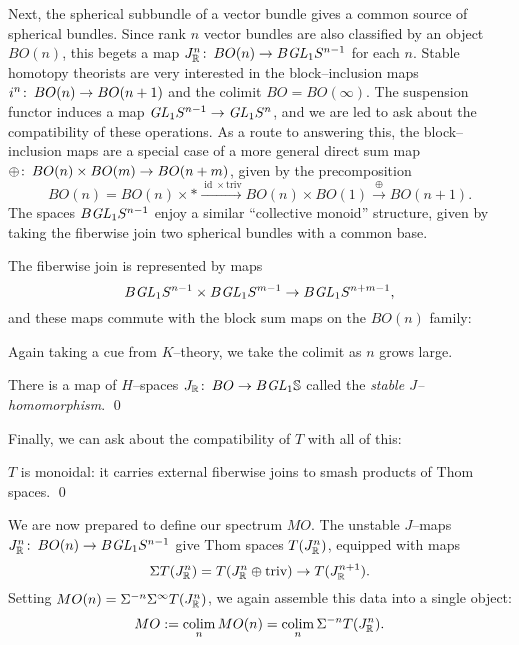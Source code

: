 Next, the spherical subbundle of a vector bundle gives a common source of spherical bundles.  Since rank $n$ vector bundles are also classified by an object $BO(n)$, this begets a map $J_{\mathbb R}^n\colon\thinspace BO(n) \to B \mathit{GL}_1 S^{n-1}$ for each $n$.  Stable homotopy theorists are very interested in the block--inclusion maps $i^n\colon\thinspace BO(n) \to BO(n+1)$ and the colimit $BO = BO(\infty)$.  The suspension functor induces a map $\mathit{GL}_1 S^{n-1} \to \mathit{GL}_1 S^n$, and we are led to ask about the compatibility of these operations.  As a route to answering this, the block--inclusion maps are a special case of a more general direct sum map $\oplus\colon\thinspace BO(n) \times BO(m) \to BO(n+m)$, given by the precomposition \[BO(n) = BO(n) \times * \xrightarrow{\operatorname{id} \times \text{triv}} BO(n) \times BO(1) \xrightarrow\oplus BO(n+1).\] The spaces $B \mathit{GL}_1 S^{n-1}$ enjoy a similar ``collective monoid'' structure, given by taking the fiberwise join two spherical bundles with a common base.
\begin{lemma}
The fiberwise join is represented by maps \[B\mathit{GL}_1 S^{n-1} \times B\mathit{GL}_1 S^{m-1} \to B\mathit{GL}_1 S^{n+m-1},\] and these maps commute with the block sum maps on the $BO(n)$ family: 
\begin{center}
\end{center}
\end{lemma}
\noindent Again taking a cue from $K$--theory, we take the colimit as $n$ grows large.
\begin{corollary}
There is a map of $H$--spaces $J_{\mathbb R}\colon\thinspace BO \to B\mathit{GL}_1 \mathbb S$ called the \textit{stable $J$--homomorphism}. \qed
\end{corollary}
\noindent Finally, we can ask about the compatibility of $T$ with all of this:
\begin{lemma}\label{ThomSpacesAreMonoidal}
$T$ is monoidal: it carries external fiberwise joins to smash products of Thom spaces. \qed
\end{lemma}

We are now prepared to define our spectrum $MO$.  The unstable $J$--maps $J_{\mathbb R}^n\colon\thinspace BO(n) \to B\mathit{GL}_1 S^{n-1}$ give Thom spaces $T(J_{\mathbb R}^n)$, equipped with maps \[\Sigma T(J_{\mathbb R}^n) = T(J_{\mathbb R}^n \oplus \text{triv}) \to T(J_{\mathbb R}^{n+1}).\] Setting $MO(n) = \Sigma^{-n} \Sigma^\infty T(J_{\mathbb R}^n)$, we again assemble this data into a single object: \[MO := \operatorname*{colim}_n MO(n) = \operatorname*{colim}_n \Sigma^{-n} T(J_{\mathbb R}^n).\]


